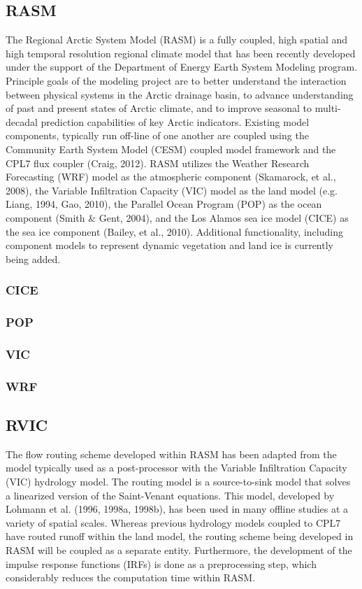 \subsection{RASM}

The Regional Arctic System Model (RASM) is a fully coupled, high spatial and high temporal resolution regional climate model that has been recently developed under the support of the Department of Energy Earth System Modeling program.
Principle goals of the modeling project are to better understand the interaction between physical systems in the Arctic drainage basin, to advance understanding of past and present states of Arctic climate, and to improve seasonal to multi-decadal prediction capabilities of key Arctic indicators.
Existing model components, typically run off-line of one another are coupled using the Community Earth System Model (CESM) coupled model framework and the CPL7 flux coupler (Craig, 2012).
RASM utilizes the Weather Research Forecasting (WRF) model as the atmospheric component (Skamarock, et al., 2008), the Variable Infiltration Capacity (VIC) model as the land model (e.g. Liang, 1994, Gao, 2010), the Parallel Ocean Program (POP) as the ocean component (Smith & Gent, 2004), and the Los Alamos sea ice model (CICE) as the sea ice component (Bailey, et al., 2010).
Additional functionality, including component models to represent dynamic vegetation and land ice is currently being added.

\subsubsection{CICE}

\subsubsection{POP}

\subsubsection{VIC}

\subsubsection{WRF}

\subsection{RVIC}

The flow routing scheme developed within RASM has been adapted from the model typically used as a post-processor with the Variable Infiltration Capacity (VIC) hydrology model. The routing model is a source-to-sink model that solves a linearized version of the Saint-Venant equations. This model, developed by Lohmann et al. (1996, 1998a, 1998b), has been used in many offline studies at a variety of spatial scales.  Whereas previous hydrology models coupled to CPL7 have routed runoff within the land model, the routing scheme being developed in RASM will be coupled as a separate entity. Furthermore, the development of the impulse response functions (IRFs) is done as a preprocessing step, which considerably reduces the computation time within RASM.

